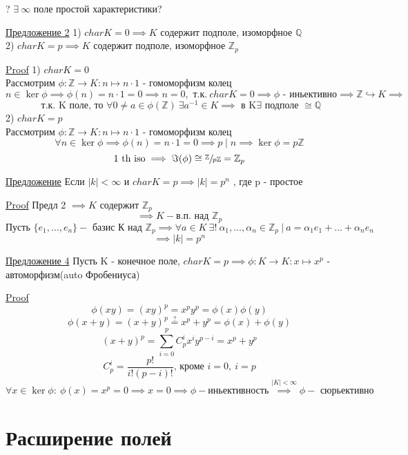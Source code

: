 \documentclass[a4paper]{article}
\begin{document}
? $ \exists \ \infty$ поле простой характеристики?

\underline{Предложение 2} 1) $ char K = 0 \implies K $ содержит подполе, изоморфное
$ \mathbb{Q} $ \\
2) $ char K = p \implies K $ содержит подполе, изоморфное $ \mathbb{Z}_p $ 

\underline{Proof} 1) $ char K = 0 $ \\
Рассмотрим $ \phi: \mathbb{Z} \to K: n \mapsto n \cdot 1 $ - гомоморфизм колец 
\[
    n \in \ker \phi \implies \phi(n) = n \cdot 1 = 0 \implies n = 0, \text{ т.к.}
    \ char K = 0 \implies \phi \text{ - иньективно} \implies \mathbb{Z}
    \hookrightarrow K \implies
\]
\[
    \text{ т.к. K поле, то } \forall 0 \neq a \in
    \phi(\mathbb{Z}) \ \exists a^{-1} \in K \implies \text{ в K} \exists \text{ 
    подполе } \cong \mathbb{Q}
\]
2) $ char K = p $ \\
Рассмотрим $ \phi: \mathbb{Z} \to K: n \mapsto n \cdot 1 $ - гомоморфизм колец 
\[
    \forall n \in \ker \phi \implies \phi(n) = n \cdot 1 = 0 \implies 
    p \mid n \implies \ker \phi = p \mathbb{Z}
\]
\[
    \text{1 th iso} \implies \Im(\phi) \cong \sfrac{\mathbb{Z}}{p \mathbb{Z}} = 
    \mathbb{Z}_p
\]

\underline{Предложение} Если $ |k| < \infty $ и $ char K = p \implies |k| = p^{n} $ 
, где p - простое

\underline{Proof} Предл 2 $ \implies K $ содержит $ \mathbb{Z}_p $ 
\[
    \implies K - \text{в.п. над } \mathbb{Z}_p
\]
\[
    \text{Пусть } \{ e_1, \dots, e_n \} - \text{ базис К над } \mathbb{Z}_p \implies
    \forall a \in K \ \exists! \ \alpha_1, \dots, \alpha_n \in \mathbb{Z}_p\ | \ 
    a = \alpha_1 e_1 + \dots + \alpha_n e_n
\]
\[
    \implies |k| = p^{n}
\]

\underline{Предложение 4} Пусть K - конечное поле, $ char K = p \implies
\phi: K \to K: x \mapsto x^{p} $ - автоморфизм(auto Фробениуса) 

\underline{Proof}
\[
    \phi(xy) = (xy)^{p} = x^{p} y^{p} = \phi(x) \phi(y)
\]
\[
    \phi(x+y) = (x+y)^{p} \stackrel{?}{=} x^{p} + y^{p} = \phi(x) + \phi(y)
\]
\[
    (x+y)^{p} = \sum_{i=0}^{p} C_p^{i} x^{i}y^{p-i} = x^{p} + y^{p}
\]
\[
    C_p^{i} = \frac{p!}{i! (p-i)!} \text{, кроме } i = 0, \ i = p
\]
\[
    \forall x \in \ker \phi:\ \phi(x) = x^{p} = 0 \implies x = 0 \implies
    \phi - \text{иньективность} \stackrel{|K| < \infty}{\implies} \phi - 
    \text{ сюрьективно}
\]

\section*{Расширение полей}
\end{document}
